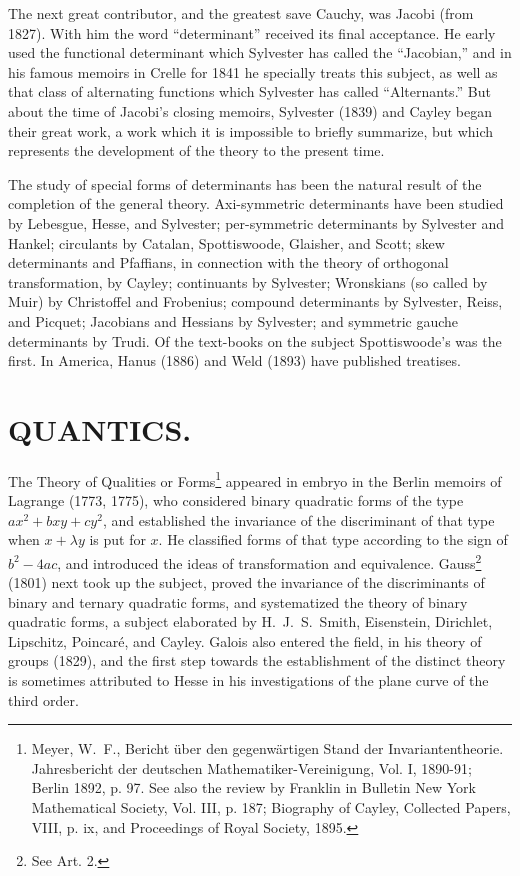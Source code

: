 \documentclass[oneside]{book}
\begin{document}
The next great contributor, and the greatest save Cauchy, was Jacobi
(from 1827). With him the word ``determinant'' received its final
acceptance. He early used the functional determinant which Sylvester
has called the ``Jacobian,'' and in his famous memoirs in Crelle for
1841 he specially treats this subject, as well as that class of
alternating functions which Sylvester has called ``Alternants.'' But
about the time of Jacobi's closing memoirs, Sylvester (1839) and
Cayley began their great work, a work which it is impossible to
briefly summarize, but which represents the development of the
theory to the present time.

The study of special forms of determinants has been the natural
result of the completion of the general theory. Axi-symmetric
determinants have been studied by Lebesgue, Hesse, and Sylvester;
per-symmetric determinants by Sylvester and Hankel; circulants by
Catalan, Spottiswoode, Glaisher, and Scott; skew determinants and
Pfaffians, in connection with the theory of orthogonal
transformation, by Cayley; continuants by Sylvester; Wronskians (so
called by Muir) by Christoffel and Frobenius; compound determinants
by Sylvester, Reiss, and Picquet; Jacobians and Hessians by
Sylvester; and symmetric gauche determinants by Trudi. Of the
text-books on the subject Spottiswoode's was the first. In America,
Hanus (1886) and Weld (1893) have published treatises.

\chapter{QUANTICS.}

The Theory of Qualities or Forms\footnote{Meyer, W.~F., Bericht
\"uber den gegenw\"artigen Stand der Invariantentheorie.
Jahresbericht der deutschen Mathematiker-Vereinigung, Vol. I,
1890-91; Berlin 1892, p. 97. See also the review by Franklin in
Bulletin New York Mathematical Society, Vol. III, p. 187; Biography
of Cayley, Collected Papers, VIII, p. ix, and Proceedings of Royal
Society, 1895.} appeared in embryo in the Berlin memoirs of Lagrange
(1773, 1775), who considered binary quadratic forms of the type
$ax^2+bxy+cy^2$, and established the invariance of the discriminant
of that type when $x+\lambda y$ is put for $x$. He classified forms
of that type according to the sign of $b^2-4ac$, and introduced the
ideas of transformation and equivalence. Gauss\footnote{See
Art. 2.} (1801) next took up the subject, proved the invariance of
the discriminants of binary and ternary quadratic forms, and
systematized the theory of binary quadratic forms, a subject
elaborated by H.~J.~S.~Smith, Eisenstein, Dirichlet, Lipschitz,
Poincar\'e, and Cayley. Galois also entered the field, in his
theory of groups (1829), and the first step towards the
establishment of the distinct theory is sometimes attributed to
Hesse in his investigations of the plane curve of the third order.
\end{document}
